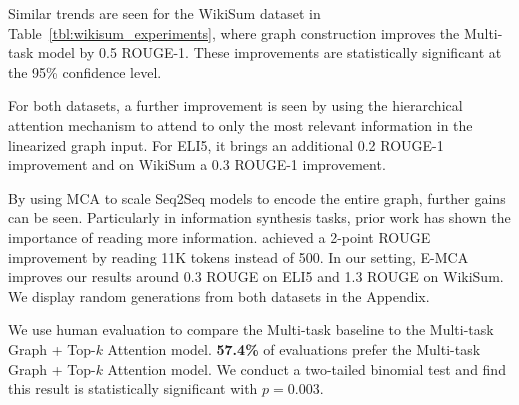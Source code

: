 \documentclass[11pt,a4paper]{article}
\begin{document}
Similar trends are seen for the WikiSum dataset in Table~\ref{tbl:wikisum_experiments}, where graph construction improves the  Multi-task model by 0.5 ROUGE-1. These improvements are statistically significant at the 95\% confidence level. 

For both datasets, a further improvement is seen by using the hierarchical attention mechanism to attend to only the most relevant information in the linearized graph input. For ELI5, it brings an additional 0.2 ROUGE-1 improvement and on WikiSum a 0.3 ROUGE-1 improvement. 

By using MCA to scale Seq2Seq models to encode the entire graph, further gains can be seen. Particularly in information synthesis tasks, prior work has shown the importance of reading more information. \citet{liu2018generating} achieved a 2-point ROUGE improvement by reading 11K tokens instead of 500. In our setting, E-MCA improves our results around 0.3 ROUGE on ELI5 and 1.3 ROUGE on WikiSum. We display random generations from both datasets in the Appendix.

We use human evaluation to compare the Multi-task baseline to the Multi-task Graph + Top-$k$ Attention model. \textbf{57.4\%} of evaluations prefer the Multi-task Graph + Top-$k$ Attention model. We conduct a two-tailed binomial test and find this result is statistically significant with $p = 0.003$.
\end{document}
